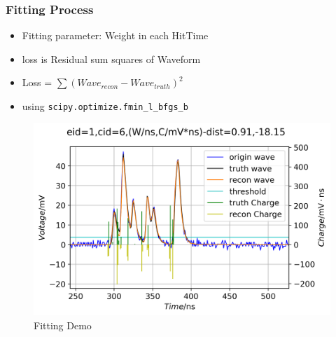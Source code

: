 \documentclass{beamer}
\begin{document}
\begin{frame}
\frametitle{Fitting Process}
\begin{itemize}
    \item Fitting parameter: Weight in each HitTime
    \item loss is Residual sum squares of Waveform
    \item Loss = $\sum(Wave_{recon}-Wave_{truth})^{2}$
    \item using \lstinline{scipy.optimize.fmin_l_bfgs_b}
\end{itemize}
\setlength{\belowcaptionskip}{0mm}
\begin{figure}
    \centering
    \caption{Fitting Demo}
    \includegraphics[width=0.7\linewidth]{img/demo.png}
\end{figure}
\end{frame}
\end{document}
